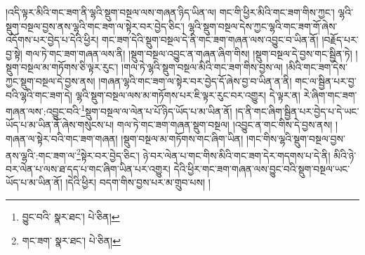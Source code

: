 །འདི་ལྟར་མིའི་གང་ཟག་ནི་ལྷའི་སྡུག་བསྔལ་ལས་གཞན་ཉིད་ཡིན་ལ། གང་གི་ཕྱིར་མིའི་གང་ཟག་གིས་ཀྱང་། ལྷའི་སྡུག་བསྔལ་བྱས་ནས་ལྷའི་གང་ཟག་ལ་སྟེར་བར་བྱེད་ཅིང་། ལྷའི་སྡུག་བསྔལ་དེས་ཀྱང་ལྷའི་གང་ཟག་གོ་ཞེས་འདོགས་པར་བྱེད་པ་དེའི་ཕྱིར། གང་ཟག་དེའི་སྡུག་བསྔལ་དེ་ནི་གང་ཟག་གཞན་ལས་འབྱུང་བ་ཡིན་ནོ། །བརྗོད་པར་བྱ་སྟེ། གལ་ཏེ་གང་ཟག་གཞན་ལས་ནི། །སྡུག་བསྔལ་འབྱུང་ན་གཞན་ཞིག་གིས། །སྡུག་བསྔལ་དེ་བྱས་གང་སྦྱིན་ཏེ། །སྡུག་བསྔལ་མ་གཏོགས་ཅི་ལྟར་རུང་། །གལ་ཏེ་ལྷའི་སྡུག་བསྔལ་མིའི་གང་ཟག་གིས་བྱས་ལ། །མིའི་གང་ཟག་དེས་ཀྱང་སྡུག་བསྔལ་དེ་བྱས་ནས། །གཞན་ལྷའི་གང་ཟག་ལ་སྟེར་བར་བྱེད་དོ་ཞེས་བྱ་བ་ཡིན་ན་ནི། གང་ལ་སྦྱིན་པར་བྱ་བའི་ལྷའི་གང་ཟག་དེ། ལྷའི་སྡུག་བསྔལ་ལས་མ་གཏོགས་པར་ཇི་ལྟར་རུང་བར་འགྱུར། དེ་ལྟར་ན། རེ་ཞིག་གང་ཟག་གཞན་ལས་:འབྱུང་བའི་\footnote{བྱུང་བའི་  སྣར་ཐང་།  པེ་ཅིན། }སྡུག་བསྔལ་ལ་ལེན་པ་པོ་ཉིད་ཡོད་པ་མ་ཡིན་ནོ། །ད་ནི་གང་ཞིག་སྦྱིན་པར་བྱེད་པ་དེ་ཡང་ཡོད་པ་མ་ཡིན་ནོ་ཞེས་གསུངས་པ། གལ་ཏེ་གང་ཟག་གཞན་སྡུག་བསྔལ། །འབྱུང་ན་གང་གིས་དེ་བྱས་ནས། །གཞན་ལ་སྟེར་བའི་གང་ཟག་གཞན། །སྡུག་བསྔལ་མ་གཏོགས་གང་ཞིག་ཡིན། །གང་གིས་ལྷའི་སྡུག་བསྔལ་བྱས་ནས་ལྷའི་:གང་ཟག་ལ་\footnote{གང་ཟག་  སྣར་ཐང་།  པེ་ཅིན། }སྟེར་བར་བྱེད་ཅིང་། ཉེ་བར་ལེན་པ་གང་གིས་མིའི་གང་ཟག་དེར་གདགས་པ་དེ་ནི། མིའི་ཉེ་བར་ལེན་པ་ལས་ཐ་དད་པ་གང་ཞིག་ཡིན་པར་འགྱུར། དེའི་ཕྱིར་གང་ཟག་གཞན་ལས་བྱུང་བའི་སྡུག་བསྔལ་ཡང་ཡོད་པ་མ་ཡིན་ནོ། །དེའི་ཕྱིར། བདག་གིས་བྱས་པར་མ་གྲུབ་པས། །
